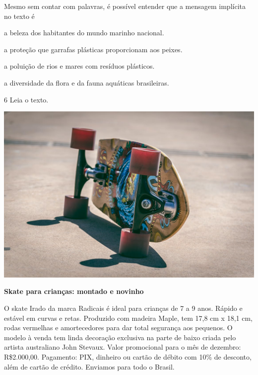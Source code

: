 Mesmo sem contar com palavras, é possível entender que a mensagem
implícita no texto é

\begin{escolha}
\item a beleza dos habitantes do mundo marinho nacional.

\item a proteção que garrafas plásticas proporcionam aos peixes.

\item a poluição de rios e mares com resíduos plásticos.

\item a diversidade da flora e da fauna aquáticas brasileiras.
\end{escolha}


\num{6} Leia o texto.


\includegraphics[width=5.25000in,height=3.47639in]{./media/simulados/image5.png}

\begin{myquote}
\textbf{Skate para crianças: montado e novinho}

O skate Irado da marca Radicais é ideal para crianças de 7 a 9 anos.
Rápido e estável em curvas e retas. Produzido com madeira Maple, tem
17,8 cm x 18,1 cm, rodas vermelhas e amortecedores para dar total
segurança aos pequenos. O modelo à venda tem linda decoração exclusiva
na parte de baixo criada pelo artista australiano John Stevaux. Valor
promocional para o mês de dezembro: R\$2.000,00. Pagamento: PIX,
dinheiro ou cartão de débito com 10\% de desconto, além de cartão de
crédito. Enviamos para todo o Brasil.

\end{myquote}

